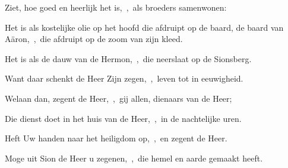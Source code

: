 \documentclass[12pt,twoside,a5paper]{article}
\begin{document}

\begin{halfparskip}
  Ziet, hoe goed en heerlijk het is,~\sep\ als broeders samenwonen:


  Het is als kostelijke olie op het hoofd die afdruipt op de baard, de baard van Aäron,~\sep\ die afdruipt op de zoom van zijn kleed.

  Het is als de dauw van de Hermon,~\sep\ die neerslaat op de Sionsberg.

  Want daar schenkt de Heer Zijn zegen,~\sep\ leven tot in eeuwigheid.
\end{halfparskip}


\begin{halfparskip}
  Welaan dan, zegent de Heer,~\sep\ gij allen, dienaars van de Heer;


  Die dienst doet in het huis van de Heer,~\sep\ in de nachtelijke uren.

  Heft Uw handen naar het heiligdom op,~\sep\ en zegent de Heer.

  Moge uit Sion de Heer u zegenen,~\sep\ die hemel en aarde gemaakt heeft.
\end{halfparskip}

\end{document}
